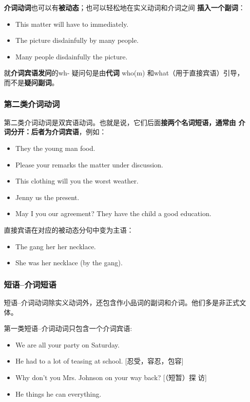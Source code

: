 \textbf{介词动词}也可以有\textbf{被动态}；也可以轻松地在实义动词和介词之间
\textbf{插入一个副词}：
\begin{itemize}
\item This matter will have to  immediately.
\item The picture  disdainfully by many people.
\item Many people  disdainfully  the picture.
\end{itemize}

就\textbf{介词宾语发问}的wh- 疑问句是由\textbf{代词} who(m) 和what（用于直接宾语）引导，而不是\textbf{疑问副词}。

\subsubsection{第二类介词动词}

第二类介词动词是双宾语动词。也就是说，它们后面\textbf{接两个名词短语，通常由
  介词分开：后者为介词宾语}，例如：

\begin{itemize}
\item They  the young man  food.
\item Please  your remarks  the matter under discussion.
\item This clothing will  you  the worst weather.
\item Jenny  us  the present.
\item May I  you  our agreement? They have 
the child  a good education.
\end{itemize}

直接宾语在对应的被动态分句中变为主语：
\begin{itemize}
\item The gang  her  her necklace.
\item She was  her necklace (by the gang).
\end{itemize}

\subsubsection{短语--介词短语}

短语--介词动词除实义动词外，还包含作小品词的副词和介词。他们多是非正式文体。

第一类短语--介词动词只包含一个介词宾语:
\begin{itemize}
\item We are all  your party on Saturday.

\item He had to  a lot of teasing at school. [忍受，容忍，包容]

\item Why don't you  Mrs. Johnson on your way back? [（短暂）探
访]

\item He things he can  everything.
\end{itemize}


